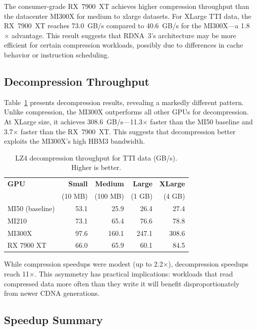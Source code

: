 \documentclass[runningheads]{llncs}
\begin{document}
The consumer-grade RX~7900~XT achieves higher compression throughput than the datacenter MI300X for medium to xlarge datasets. For XLarge TTI data, the RX~7900~XT reaches 73.0~GB/s compared to 40.6~GB/s for the MI300X---a 1.8$\times$ advantage. This result suggests that RDNA~3's architecture may be more efficient for certain compression workloads, possibly due to differences in cache behavior or instruction scheduling.

\subsection{Decompression Throughput}

Table~\ref{tab:decomp_lz4} presents decompression results, revealing a markedly different pattern. Unlike compression, the MI300X outperforms all other GPUs for decompression. At XLarge size, it achieves 308.6~GB/s---11.3$\times$ faster than the MI50 baseline and 3.7$\times$ faster than the RX~7900~XT. This suggests that decompression better exploits the MI300X's high HBM3 bandwidth.

\begin{table}[t]
\centering
\caption{LZ4 decompression throughput for TTI data (GB/s). Higher is better.}
\label{tab:decomp_lz4}
\begin{tabular}{lrrrr}
\toprule
\textbf{GPU} & \textbf{Small} & \textbf{Medium} & \textbf{Large} & \textbf{XLarge} \\
 & (10 MB) & (100 MB) & (1 GB) & (4 GB) \\
\midrule
MI50 (baseline) & 53.1 & 25.9 & 26.4 & 27.4 \\
MI210 & 73.1 & 65.4 & 76.6 & 78.8 \\
MI300X & 97.6 & 160.1 & 247.1 & 308.6 \\
RX 7900 XT & 66.0 & 65.9 & 60.1 & 84.5 \\
\bottomrule
\end{tabular}
\end{table}

While compression speedups were modest (up to 2.2$\times$), decompression speedups reach 11$\times$. This asymmetry has practical implications: workloads that read compressed data more often than they write it will benefit disproportionately from newer CDNA generations.

\subsection{Speedup Summary}
\end{document}
